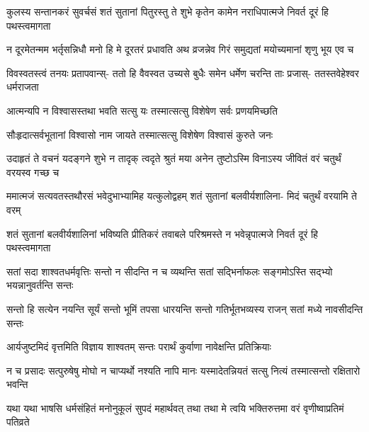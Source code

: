 \begin{center}
\fourlineindentedshloka
{कुलस्य सन्तानकरं सुवर्चसं}
{शतं सुतानां पितुरस्तु ते शुभे}
{कृतेन कामेन नराधिपात्मजे}
{निवर्त दूरं हि पथस्त्वमागता}




\fourlineindentedshloka
{न दूरमेतन्मम भर्तृसन्निधौ}
{मनो हि मे दूरतरं प्रधावति}
{अथ व्रजन्नेव गिरं समुद्यतां}
{मयोच्यमानां शृणु भूय एव च}


\fourlineindentedshloka
{विवस्वतस्त्वं तनयः प्रतापवान्स्-}
{ततो हि वैवस्वत उच्यसे बुधैः}
{समेन धर्मेण चरन्ति ताः प्रजास्-}
{ततस्तवेहेश्वर धर्मराजता}


\twolineshloka
{आत्मन्यपि न विश्वासस्तथा भवति सत्सु यः}
{तस्मात्सत्सु विशेषेण सर्वः प्रणयमिच्छति}


\twolineshloka
{सौःहृदात्सर्वभूतानां विश्वासो नाम जायते}
{तस्मात्सत्सु विशेषेण विश्वासं कुरुते जनः}



\fourlineindentedshloka
{उदाहृतं ते वचनं यदङ्गने}
{शुभे न तादृक् त्वदृते श्रुतं मया}
{अनेन तुष्टोऽस्मि विनाऽस्य जीवितं}
{वरं चतुर्थं वरयस्व गच्छ च}




\fourlineindentedshloka
{ममात्मजं सत्यवतस्तथौरसं}
{भवेदुभाभ्यामिह यत्कुलोद्वहम्}
{शतं सुतानां बलवीर्यशालिना-}
{मिदं चतुर्थं वरयामि ते वरम्}



\fourlineindentedshloka
{शतं सुतानां बलवीर्यशालिनां}
{भविष्यति प्रीतिकरं तवाबले}
{परिश्रमस्ते न भवेन्नृपात्मजे}
{निवर्त दूरं हि पथस्त्वमागता}




\fourlineindentedshloka
{सतां सदा शाश्वतधर्मवृत्तिः}
{सन्तो न सीदन्ति न च व्यथन्ति}
{सतां सद्भिर्नाफलः सङ्गमोऽस्ति}
{सद्भ्यो भयन्नानुवर्तन्ति सन्तः}


\fourlineindentedshloka
{सन्तो हि सत्येन नयन्ति सूर्यं}
{सन्तो भूमिं तपसा धारयन्ति}
{सन्तो गतिर्भूतभव्यस्य राजन्}
{सतां मध्ये नावसीदन्ति सन्तः}


\twolineshloka
{आर्यजुष्टमिदं वृत्तमिति विज्ञाय शाश्वतम्}
{सन्तः परार्थं कुर्वाणा नावेक्षन्ति प्रतिक्रियाः}


\fourlineindentedshloka
{न च प्रसादः सत्पुरुषेषु मोघो}
{न चाप्यर्थो नश्यति नापि मानः}
{यस्मादेतन्नियतं सत्सु नित्यं}
{तस्मात्सन्तो रक्षितारो भवन्ति}



\fourlineindentedshloka
{यथा यथा भाषसि धर्मसंहितं}
{मनोनुकूलं सुपदं महार्थवत्}
{तथा तथा मे त्वयि भक्तिरुत्तमा}
{वरं वृणीष्वाप्रतिमं पतिव्रते}


\end{center}
